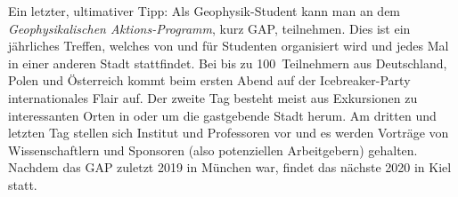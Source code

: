 \begin{multicols}{2}
Ein letzter, ultimativer Tipp: Als Geophysik-Student kann man an dem \emph{Geophysikalischen Aktions-Programm}, kurz GAP, teilnehmen.
Dies ist ein jährliches Treffen, welches von und für Studenten organisiert wird und jedes Mal in einer anderen Stadt stattfindet.
Bei bis zu 100~Teilnehmern aus Deutschland, Polen und Österreich kommt beim ersten Abend auf der Icebreaker-Party internationales Flair auf.
Der zweite Tag besteht meist aus Exkursionen zu interessanten Orten in oder um die gastgebende Stadt herum.
Am dritten und letzten Tag stellen sich Institut und Professoren vor und es werden Vorträge von Wissenschaftlern und Sponsoren (also potenziellen Arbeitgebern) gehalten.
Nachdem das GAP zuletzt 2019 in München war, findet das nächste 2020 in Kiel statt.

\end{multicols}


